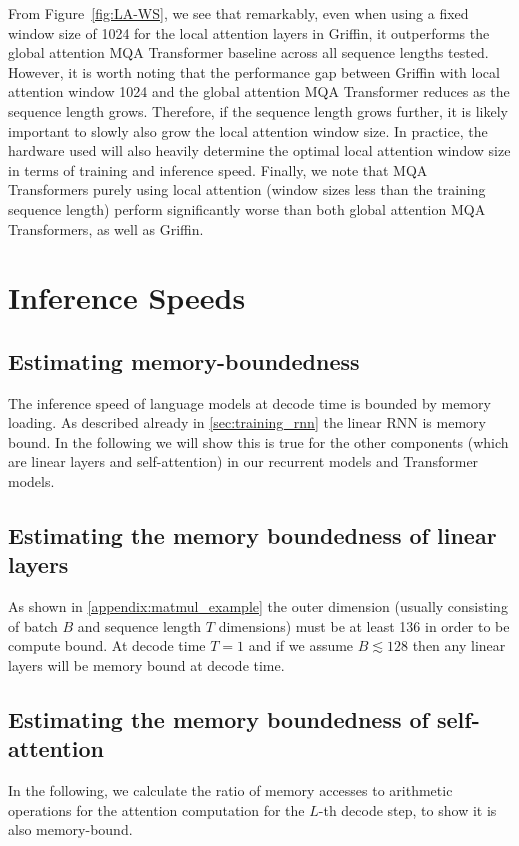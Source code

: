 \documentclass[11pt, a4paper, logo, onecolumn]{googledeepmind}
\theoremstyle{definition}
\begin{document}
From Figure~\ref{fig:LA-WS}, we see that remarkably, even when using a fixed window size of 1024 for the local attention layers in Griffin, it outperforms the global attention MQA Transformer baseline across all sequence lengths tested. However, it is worth noting that the performance gap between Griffin with local attention window 1024 and the global attention MQA Transformer reduces as the sequence length grows. Therefore, if the sequence length grows further, it is likely important to slowly also grow the local attention window size. In practice, the hardware used will also heavily determine the optimal local attention window size in terms of training and inference speed. Finally, we note that MQA Transformers purely using local attention (window sizes less than the training sequence length) perform significantly worse than both global attention MQA Transformers, as well as Griffin.

\section{Inference Speeds}

\subsection{Estimating memory-boundedness}\label{appendix:memory_bound}

The inference speed of language models at decode time is bounded by memory loading. As described already in \ref{sec:training_rnn} the linear RNN is memory bound. In the following we will show this is true for the other components (which are linear layers and self-attention) in our recurrent models and Transformer models.

\subsection{Estimating the memory boundedness of linear layers}
As shown in  \ref{appendix:matmul_example} the outer dimension (usually consisting of batch $B$ and sequence length $T$ dimensions) must be at least 136 in order to be compute bound. At decode time $T=1$ and if we assume $B \lesssim 128$ then any linear layers will be memory bound at decode time.

\subsection{Estimating the memory boundedness of self-attention}
In the following, we calculate the ratio of memory accesses to arithmetic operations for the attention computation for the $L$-th decode step, to show it is also memory-bound.
\end{document}
